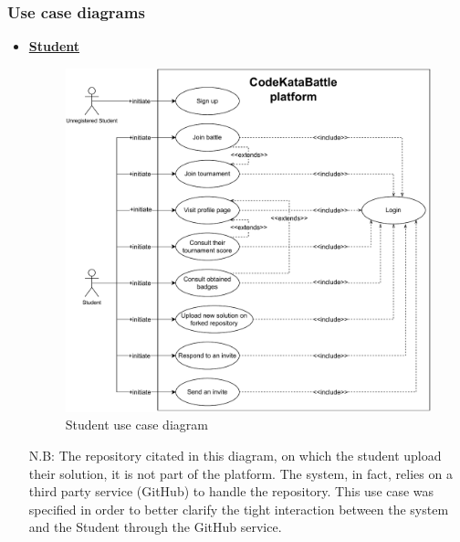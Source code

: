 \documentclass{article}
\begin{document}
{\subsubsection{Use case diagrams}
\begin{itemize}
    \item \underline{\large{\textbf{Student}}}
          \begin{figure}[H]
              \centering
              \includegraphics[scale=0.55]{images/3.2.2_UseCaseDiagrams/CaseDiagramStudent.pdf}
              \caption{Student use case diagram}
              \label{fig:studentUseCaseDiagram}
          \end{figure}

          N.B: The repository citated in this diagram, on which the student upload their solution, it is not
          part of the platform. The system, in fact, relies on a third party service (GitHub) to handle the repository.
          This use case was specified in order to better clarify the tight interaction between the system and the Student through the GitHub service.

          \newpage


\end{itemize}}
\end{document}
